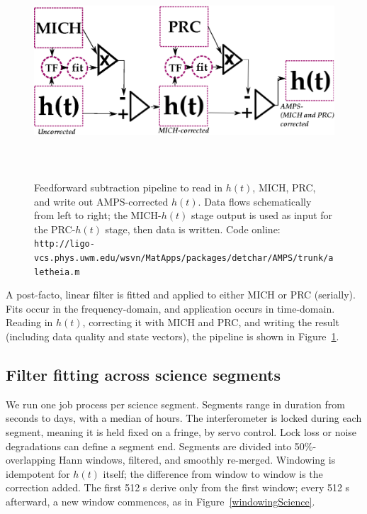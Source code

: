 \begin{figure}
\begin{center}
\includegraphics[height=80mm,width=150mm]{figure9.eps}
\caption{Feedforward subtraction pipeline to read in $h(t)$, MICH, PRC, and write out AMPS-corrected $h(t)$. Data flows schematically from left to right; the MICH-$h(t)$ stage output is used as input for the PRC-$h(t)$ stage, then data is written. Code online: \texttt{http://ligo-vcs.phys.uwm.edu/wsvn/MatApps/packages/detchar/AMPS/}\newline \texttt{trunk/aletheia.m}}
\label{pipelineGraph}
\end{center}
\end{figure}    

A post-facto, linear filter is fitted and applied to either MICH or PRC (serially). Fits occur in the frequency-domain, and application occurs in time-domain. Reading in $h(t)$, correcting it with MICH and PRC, and writing the result (including data quality and state vectors), the pipeline is shown in Figure~\ref{pipelineGraph}. 


        \subsection{Filter fitting across science segments}
        \label{filter_fitting-out-of-loop}

We run one job process per science segment. Segments range in duration from seconds to days, with a median of hours. The interferometer is locked during each segment, meaning it is held fixed on a fringe, by servo control. Lock loss or noise degradations can define a segment end. Segments are divided into 50\%-overlapping Hann windows, filtered, and smoothly re-merged. Windowing is idempotent for $h(t)$ itself; the difference from window to window is the correction added. The first 512 s derive only from the first window; every 512 s afterward, a new window commences, as in Figure~\ref{windowingScience}.

